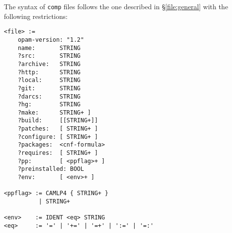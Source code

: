 \documentclass[a4paper,10pt]{article}
\begin{document}
The syntax of {\tt comp} files follows the one described in
\S\ref{file:general} with the following restrictions:

{
\begin{Verbatim}[frame=single]
<file> :=
    opam-version: "1.2"
    name:       STRING
    ?src:       STRING
    ?archive:   STRING
    ?http:      STRING
    ?local:     STRING
    ?git:       STRING
    ?darcs:     STRING
    ?hg:        STRING
    ?make:      STRING+ ]
    ?build:     [[STRING+]]
    ?patches:   [ STRING+ ]
    ?configure: [ STRING+ ]
    ?packages:  <cnf-formula>
    ?requires:  [ STRING+ ]
    ?pp:        [ <ppflag>+ ]
    ?preinstalled: BOOL
    ?env:       [ <env>+ ]

<ppflag> := CAMLP4 { STRING+ }
          | STRING+

<env>    := IDENT <eq> STRING
<eq>     := '=' | '+=' | '=+' | ':=' | '=:'
\end{Verbatim}
}
\end{document}
